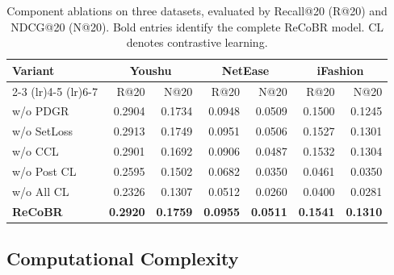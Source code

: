 \documentclass[letterpaper]{article}
\begin{document}
\begin{table}[!t]
    \centering
    {\small
    \setlength{\tabcolsep}{2pt}
    \begin{tabular}{@{}lrrrrrr@{}}
        \toprule
        \multirow{2}{*}{Variant}
        & \multicolumn{2}{c}{Youshu}
        & \multicolumn{2}{c}{NetEase}
        & \multicolumn{2}{c}{iFashion} \\
        \cmidrule(lr){2-3}
        \cmidrule(lr){4-5}
        \cmidrule(lr){6-7}
        & R@20 & N@20
        & R@20 & N@20
        & R@20 & N@20 \\
        \midrule

        w/o PDGR
        & 0.2904 & 0.1734
        & 0.0948 & 0.0509
        & 0.1500 & 0.1245 \\

        w/o SetLoss
        & 0.2913 & 0.1749
        & 0.0951 & 0.0506
        & 0.1527 & 0.1301 \\

        w/o CCL
        & 0.2901 & 0.1692
        & 0.0906 & 0.0487
        & 0.1532 & 0.1304 \\

        w/o Post CL
        & 0.2595 & 0.1502
        & 0.0682 & 0.0350
        & 0.0461 & 0.0350 \\

        w/o All CL
        & 0.2326 & 0.1307
        & 0.0512 & 0.0260
        & 0.0400 & 0.0281 \\
        \midrule

        \textbf{ReCoBR}
        & \textbf{0.2920}
        & \textbf{0.1759}
        & \textbf{0.0955}
        & \textbf{0.0511}
        & \textbf{0.1541}
        & \textbf{0.1310} \\

        \bottomrule
    \end{tabular}
    }

    \caption{Component ablations on three datasets, evaluated by
    Recall@20 (R@20) and NDCG@20 (N@20). Bold entries identify
    the complete ReCoBR model. CL denotes contrastive learning.}
    \label{tab:ablation}
\end{table}


\subsection{Computational Complexity}
\end{document}
